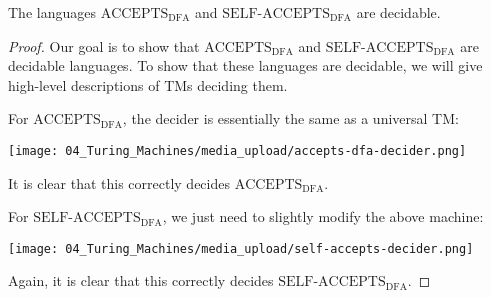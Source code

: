 \begin{flex}
\begin{theorem} \label{theorem:textACCEPTS-textDFA-and-textSELF-ACCEPTS_textDFA-are-decidable}
The languages $\mathrm{ACCEPTS}_\mathrm{DFA}$ and $\mathrm{SELF}$-$\mathrm{ACCEPTS}_\mathrm{DFA}$ are decidable.
\end{theorem}

\begin{proof}
Our goal is to show that $\mathrm{ACCEPTS}_\mathrm{DFA}$ and $\mathrm{SELF}$-$\mathrm{ACCEPTS}_\mathrm{DFA}$ are decidable languages. To show that these languages are decidable, we will give high-level descriptions of TMs deciding them. 

For $\text{ACCEPTS}_\text{DFA}$, the decider is essentially the same as a universal TM:
\begin{center}
    \texttt{[image: 04\_Turing\_Machines/media\_upload/accepts-dfa-decider.png]}
\end{center}
It is clear that this correctly decides $\text{ACCEPTS}_\text{DFA}$. 

For $\text{SELF-ACCEPTS}_\text{DFA}$, we just need to slightly modify the above machine:
\begin{center}
    \texttt{[image: 04\_Turing\_Machines/media\_upload/self-accepts-decider.png]}
\end{center}
Again, it is clear that this correctly decides $\text{SELF-ACCEPTS}_\text{DFA}$.
\end{proof}
\end{flex}


